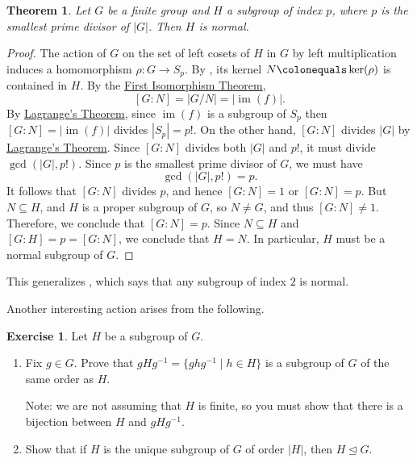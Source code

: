 \documentclass[12pt]{report}
\newtheorem{theorem}{Theorem}[chapter]
\numberwithin{equation}{section}
\numberwithin{theorem}{chapter}
\theoremstyle{definition}
\newtheorem{exercise}{Exercise}
\newtheorem*{basic properties}{Basic Properties}
\newtheorem*{Important Remark}{Important Remark}
\renewcommand{\ker}{\operatorname{ker}}
\DeclareMathOperator{\im}{im}
\def\norm{\mathrel{\unlhd}}
\begin{document}
\begin{theorem}
	 Let $G$ be a finite group and $H$ a subgroup of index $p$, where $p$ is the smallest prime divisor of $|G|$. Then $H$ is normal.
\end{theorem}


\begin{proof} 
The action of $G$ on the set of left cosets of $H$ in $G$ by left multiplication induces a homomorphism $\rho\!: G \to S_p$. By , its kernel $N \colonequals \ker(\rho)$ is contained in $H$. By the \hyperref[first iso thm]{First Isomorphism Theorem},
$$[G:N] = |G/N| = |\im(f)|.$$
By \hyperref[Lagrange]{Lagrange's Theorem}, since $\im(f)$ is a subgroup of $S_p$ then $[G:N] = |\im(f)|$ divides $|S_p|=p!$.
On the other hand, $[G:N]$ divides $|G|$ by \hyperref[Lagrange]{Lagrange's Theorem}. Since $[G:N]$ divides both $|G|$ and $p!$, it must divide $\gcd(|G|,p!)$. Since $p$ is the smallest prime divisor of $G$, we must have 
$$\gcd(|G|, p!) = p.$$ 
It follows that $[G:N]$ divides $p$, and hence $[G:N] =1$ or $[G:N] = p$. 
But $N \subseteq H$, and $H$ is a proper subgroup of $G$, so $N \neq G$, and thus $[G:N] \neq 1$. Therefore, we conclude that $[G:N] = p$. 
Since $N \subseteq H$ and $[G:H] = p = [G : N]$, we conclude that $H = N$. In particular, $H$ must be a normal subgroup of $G$.
\end{proof}


This generalizes , which says that any subgroup of index $2$ is normal.

\newpage

Another interesting action arises from the following.


\begin{exercise}\label{conjugation on subgroups is an action and conjugate subgroups have same order}
Let $H$ be a subgroup of $G$.
\begin{enumerate}[label=(\alph*),leftmargin=20pt]
\item Fix $g \in G$. Prove that $gHg^{-1}=\{ghg^{-1} \mid h\in H\}$ is a subgroup of $G$ of the same order as $H$.

\noindent
Note: we are not assuming that $H$ is finite, so you must show that there is a bijection between $H$ and $gHg^{-1}$.

\item Show that if $H$ is the unique subgroup of $G$ of order $|H|$, then $H \norm G$.
\end{enumerate}
\end{exercise}
\end{document}
